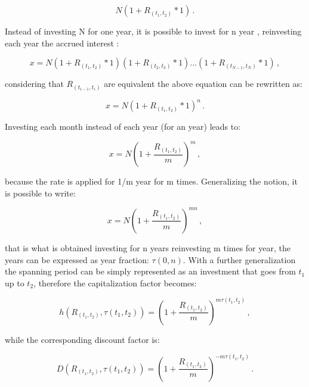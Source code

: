 \begin{equation*}
  N(1+ R_{(t_{1},t_{2})}*1)\,.
\end{equation*}

Instead of investing N for one year, it is possible to invest for n year , reinvesting each year the accrued interest :

\begin{equation*}
  x=N(1+ R_{(t_{1},t_{2})}*1)(1+ R_{(t_{2},t_{3})}*1)\dots(1+ R_{(t_{N-1},t_{N})}*1)\,,
\end{equation*}

considering that $R_{(t_{i-1},t_{i})}$ are equivalent the above equation can be rewritten as:

\begin{equation*}
  x=N(1+ R_{(t_{1},t_{2})}*1)^{n}\,.
\end{equation*}

Investing each month instead of each year (for an year) leads to:

\begin{equation*}
  x=N\left(1+ \dfrac{R_{(t_{1},t_{2})}}{m}\right)^{m}\,,
\end{equation*}

because the rate is applied for 1/m year for m times.
Generalizing the notion, it is possible to write:

\begin{equation*}
  x=N\left(1+ \dfrac{R_{(t_{1},t_{2})}}{m}\right)^{m n}\,,
\end{equation*}

that is what is obtained investing for n years reinvesting m times for year, the years can be expressed as year fraction: $\tau{(0,n)}$.
With a further generalization the spanning period can be simply represented as an investment that goes from $t_{1}$ up to $t_{2}$, therefore the capitalization factor becomes:

\begin{equation}
    h(R_{(t_{1},t_{2})},\tau(t_{1},t_{2})) =\left(1+ \dfrac{R_{(t_{1},t_{2})}}{m}\right)^{m  \tau(t_{1},t_{2})}\,,
    \label{eq:compounded_interest_cf}
\end{equation}

while the corresponding discount factor is:

\begin{equation}
    D(R_{(t_{1},t_{2})},\tau(t_{1},t_{2})) =\left(1+ \dfrac{R_{(t_{1},t_{2})}}{m}\right)^{-m  \tau(t_{1},t_{2})}\,.
    \label{eq:compounded_interest_df}
\end{equation}

